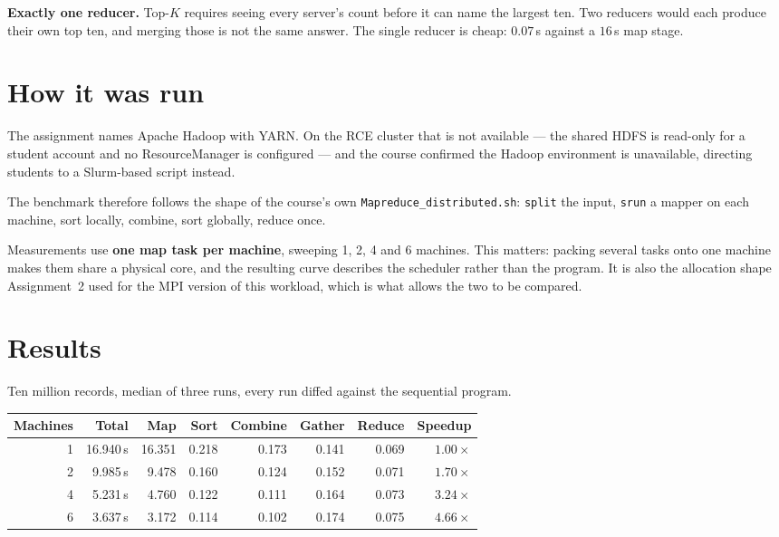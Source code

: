 \documentclass[11pt,a4paper]{article}
\begin{document}
\textbf{Exactly one reducer.} Top-$K$ requires seeing every server's count
before it can name the largest ten. Two reducers would each produce their own
top ten, and merging those is not the same answer. The single reducer is cheap:
$0.07$\,s against a $16$\,s map stage.

\section{How it was run}

The assignment names Apache Hadoop with YARN. On the RCE cluster that is not
available --- the shared HDFS is read-only for a student account and no
ResourceManager is configured --- and the course confirmed the Hadoop
environment is unavailable, directing students to a Slurm-based script instead.

The benchmark therefore follows the shape of the course's own
\texttt{Mapreduce\_distributed.sh}: \texttt{split} the input, \texttt{srun} a
mapper on each machine, sort locally, combine, sort globally, reduce once.

Measurements use \textbf{one map task per machine}, sweeping 1, 2, 4 and 6
machines. This matters: packing several tasks onto one machine makes them share
a physical core, and the resulting curve describes the scheduler rather than the
program. It is also the allocation shape Assignment~2 used for the MPI version
of this workload, which is what allows the two to be compared.

\section{Results}

Ten million records, median of three runs, every run diffed against the
sequential program.

\begin{center}\small
\begin{tabular}{@{}rrrrrrrr@{}}
\toprule
\textbf{Machines} & \textbf{Total} & \textbf{Map} & \textbf{Sort} &
\textbf{Combine} & \textbf{Gather} & \textbf{Reduce} & \textbf{Speedup} \\
\midrule
1 & 16.940\,s & 16.351 & 0.218 & 0.173 & 0.141 & 0.069 & $1.00\times$ \\
2 & \phantom{0}9.985\,s & \phantom{0}9.478 & 0.160 & 0.124 & 0.152 & 0.071 & $1.70\times$ \\
4 & \phantom{0}5.231\,s & \phantom{0}4.760 & 0.122 & 0.111 & 0.164 & 0.073 & $3.24\times$ \\
6 & \phantom{0}3.637\,s & \phantom{0}3.172 & 0.114 & 0.102 & 0.174 & 0.075 & $\mathbf{4.66\times}$ \\
\bottomrule
\end{tabular}
\end{center}
\end{document}
